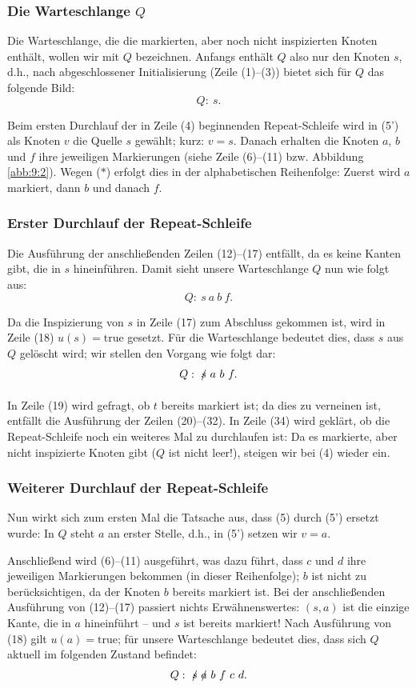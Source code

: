 \documentclass[smaller]{beamer}
\begin{document}
\begin{frame}
\frametitle{Die Warteschlange $Q$}
Die Warteschlange, die die markierten, aber noch nicht inspizierten Knoten enthält, wollen wir mit $Q$ bezeichnen. Anfangs enthält $Q$ also nur den Knoten $s$, d.h., nach abgeschlossener Initialisierung (Zeile (1)--(3)) bietet sich für $Q$ das folgende Bild: 
\[
 Q:\ s.
\]

Beim ersten Durchlauf der in Zeile (4) beginnenden Repeat-Schleife wird in (5') als Knoten $v$ die Quelle $s$ gewählt; kurz: $v=s$. Danach erhalten die Knoten $a$, $b$ und $f$ ihre jeweiligen Markierungen (siehe Zeile (6)--(11) bzw. Abbildung \ref{abb:9:2}). Wegen ($*$) erfolgt dies in der alphabetischen Reihenfolge: Zuerst wird $a$ markiert, dann $b$ und danach $f$.
\end{frame}

\begin{frame}
 \frametitle{Erster Durchlauf der Repeat-Schleife}
 Die Ausführung der anschließenden Zeilen (12)--(17) entfällt, da es keine Kanten gibt, die in $s$ hineinführen. Damit sieht unsere Warteschlange $Q$ nun wie folgt aus:
\[
Q:\ s\ a\ b\ f.
\]

Da die Inspizierung von $s$ in Zeile (17) zum Abschluss gekommen ist, wird in Zeile (18) $u(s) = \text{true}$ gesetzt. Für die Warteschlange bedeutet dies, dass $s$ aus $Q$ gelöscht wird; wir stellen den Vorgang wie folgt dar:
\[
Q:\ \xout{s}\ a\ b\ f.
\]

In Zeile (19) wird gefragt, ob $t$ bereits markiert ist; da dies zu verneinen ist, entfällt die Ausführung der Zeilen (20)--(32). In Zeile (34) wird geklärt, ob die Repeat-Schleife noch ein weiteres Mal zu durchlaufen ist: Da es markierte, aber nicht inspizierte Knoten gibt ($Q$ ist nicht leer!), steigen wir bei (4) wieder ein.
\end{frame}

\begin{frame}
\frametitle{Weiterer Durchlauf der Repeat-Schleife}
\alert{Nun wirkt sich zum ersten Mal die Tatsache aus, dass (5) durch (5') ersetzt wurde:} In $Q$ steht $a$ an erster Stelle, d.h., in (5') setzen wir $v=a$. \\ \vspace*{0.2cm}

Anschließend wird (6)--(11) ausgeführt, was dazu führt, dass $c$ und $d$ ihre jeweiligen Markierungen bekommen (in dieser Reihenfolge); $b$ ist nicht zu berücksichtigen, da der Knoten $b$ bereits markiert ist. Bei der anschließenden Ausführung von (12)--(17) passiert nichts Erwähnenswertes: $(s,a)$ ist die einzige Kante, die in $a$ hineinführt -- und $s$ ist bereits markiert! Nach Ausführung von (18) gilt $u(a) = \text{true}$; für unsere Warteschlange bedeutet dies, dass sich $Q$ aktuell im folgenden Zustand befindet:
\[
Q:\ \xout{s}\ \xout{a}\ b\ f\ c\ d.
\]
\end{frame}
\end{document}

